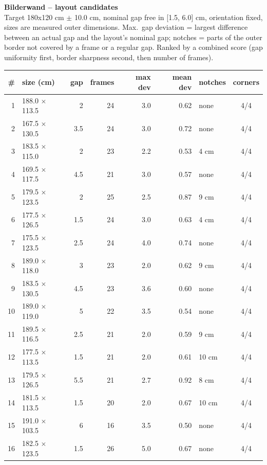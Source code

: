 \documentclass[a4paper,landscape,10pt]{article}
\begin{document}
{\LARGE\bfseries Bilderwand -- layout candidates}\\[4pt]
{\small Target 180x120 cm $\pm$ 10.0 cm, nominal gap free in
[1.5, 6.0] cm, orientation fixed, sizes are measured outer dimensions.
Max.\ gap deviation = largest difference between an actual gap and the layout's nominal gap;
notches = parts of the outer border not covered by a frame or a regular gap. Ranked by a combined
score (gap uniformity first, border sharpness second, then number of frames).}\\[10pt]
\begin{minipage}[t]{0.6\textwidth}\vspace{0pt}
\begin{tabular}{@{}r l r r r r l c@{}}
\toprule
\# & size (cm) & gap & frames & max dev & mean dev & notches & corners \\
\midrule
1 & 188.0 $\times$ 113.5 & 2 & 24 & 3.0 & 0.62 & none & 4/4 \\
2 & 167.5 $\times$ 130.5 & 3.5 & 24 & 3.0 & 0.72 & none & 4/4 \\
3 & 183.5 $\times$ 115.0 & 2 & 23 & 2.2 & 0.53 & 4 cm & 4/4 \\
4 & 169.5 $\times$ 117.5 & 4.5 & 21 & 3.0 & 0.57 & none & 4/4 \\
5 & 179.5 $\times$ 123.5 & 2 & 25 & 2.5 & 0.87 & 9 cm & 4/4 \\
6 & 177.5 $\times$ 126.5 & 1.5 & 24 & 3.0 & 0.63 & 4 cm & 4/4 \\
7 & 175.5 $\times$ 123.5 & 2.5 & 24 & 4.0 & 0.74 & none & 4/4 \\
8 & 189.0 $\times$ 118.0 & 3 & 23 & 2.0 & 0.62 & 9 cm & 4/4 \\
9 & 183.5 $\times$ 130.5 & 4.5 & 23 & 3.6 & 0.60 & none & 4/4 \\
10 & 189.0 $\times$ 119.0 & 5 & 22 & 3.5 & 0.54 & none & 4/4 \\
11 & 189.5 $\times$ 116.5 & 2.5 & 21 & 2.0 & 0.59 & 9 cm & 4/4 \\
12 & 177.5 $\times$ 113.5 & 1.5 & 21 & 2.0 & 0.61 & 10 cm & 4/4 \\
13 & 179.5 $\times$ 126.5 & 5.5 & 21 & 2.7 & 0.92 & 8 cm & 4/4 \\
14 & 181.5 $\times$ 113.5 & 1.5 & 20 & 2.0 & 0.67 & 10 cm & 4/4 \\
15 & 191.0 $\times$ 103.5 & 6 & 16 & 3.5 & 0.50 & none & 4/4 \\
16 & 182.5 $\times$ 123.5 & 1.5 & 26 & 5.0 & 0.67 & none & 4/4 \\
\bottomrule
\end{tabular}
\end{minipage}\hfill
\end{document}
